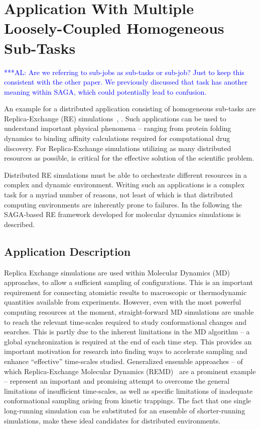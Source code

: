 \documentclass[conference,final]{IEEEtran}
\newcommand{\alnote}[1]{ {\textcolor{blue} { ***AL: #1 }}}
\newcommand{\alnote}[1]{}
\begin{document}
\section{Application With Multiple Loosely-Coupled Homogeneous
  Sub-Tasks}  
\alnote{Are we referring to sub-jobs as sub-tasks or sub-job? Just
to keep this consistent with the other paper. We previously discussed that task
has another meaning within SAGA, which could potentially lead to confusion.}
  
An example for a distributed application consisting of homogeneous sub-tasks
are Replica-Exchange (RE) simulations~\cite{Sugita:1999rm}, \cite{hansmann}. Such applications can be used to understand important
physical phenomena -- ranging from protein folding dynamics to binding
affinity calculations required for computational drug discovery. 
For Replica-Exchange simulations utilizing as many 
distributed resources as possible, is critical for the effective solution of 
the scientific problem.  

Distributed RE simulations must be able to orchestrate different 
resources in a complex and dynamic environment.  Writing
such an applications is a complex task for a myriad number of reasons,
not least of which is that distributed computing environments are
inherently prone to failures. In the following the SAGA-based RE 
framework developed for molecular dynamics simulations
is described.  

\subsection{Application Description}

Replica Exchange simulations are used within Molecular Dynamics (MD) approaches,
to allow a sufficient sampling of configurations. This is
an important requirement for connecting atomistic results to
macroscopic or thermodynamic quantities available from experiments.
However, even with the most powerful computing resources at the
moment, straight-forward MD simulations are unable to reach the
relevant time-scales required to study conformational changes and
searches. This is partly due to the inherent limitations in the MD
algorithm -- a global synchronization is required at the end of each
time step.  This provides an important motivation for research into
finding ways to accelerate sampling and enhance ``effective''
time-scales studied. Generalized ensemble approaches -- of which
Replica-Exchange Molecular Dynamics (REMD)~\cite{Sugita:1999rm} are a
prominent example -- represent an important and promising attempt to
overcome the general limitations of insufficient time-scales, as well
as specific limitations of inadequate conformational sampling arising
from kinetic trappings.  The fact that one single long-running
simulation can be substituted for an ensemble of shorter-running
simulations, make these ideal candidates for distributed environments.
\end{document}
